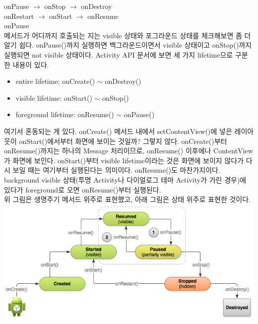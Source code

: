onPause $\rightarrow$ onStop $\rightarrow$ onDestroy\\

onRestart $\rightarrow$ onStart $\rightarrow$ onResume\\

onPause
\\

메서드가 어디까지 호출되는 지는 visible 상태와 포그라운드 상태를 체크해보면 좀 더 알기 쉽다.
onPause()까지 실행하면 백그라운드이면서 visible 상태이고 onStop()까지 실행되면 not visible 상태이다. 
Activity API 문서에 보면 세 가지 lifetime으로 구분한 내용이 있다.
\begin{itemize}
\item entire lifetime: onCreate() $\sim$
 onDestroy()
\item visible lifetime: onStart() $\sim$
 onStop()
\item foreground lifetime: onResume() $\sim$
 onPause()
\end{itemize}
여기서 혼동되는 게 있다. onCreate() 메서드 내에서 setContentView()에 넣은 레이아웃이 onStart()에서부터 화면에 보이는 것일까? 그렇지 않다. 
onCreate()부터 onResume()까지는 하나의 Message 처리이므로, onResume() 이후에나 ContentView가 화면에 보인다.
onStart()부터 visible lifetime이라는 것은 화면에 보이지 않다가 다시 보일 때는 여기부터 실행된다는 의미이다.
onResume()도 마찬가지이다. background visible 상태(투명 Activity나 다이얼로그 테마 Activity가 가린 경우)에 있다가 foreground로 오면 onResume()부터 실행된다.\\

위 그림은 생명주기 메서드 위주로 표현했고, 아래 그림은 상태 위주로 표현한 것이다.\\
\includegraphics[scale=0.5]{basic-lifecycle-paused}

